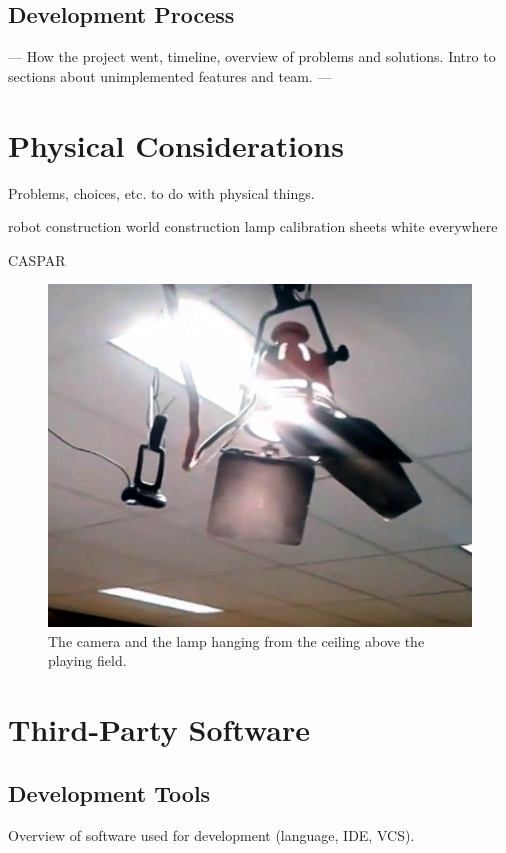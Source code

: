\documentclass[10pt, abstracton, twocolumn]{scrartcl}
\begin{document}
\subsection{Development Process}
---
How the project went, timeline, overview of problems and solutions. Intro to sections about unimplemented features and team.
---

\section{Physical Considerations}
Problems, choices, etc. to do with physical things.

robot construction
world construction
lamp
calibration sheets
white everywhere

CASPAR

\begin{figure}
        \centering
        \includegraphics[width=\columnwidth]{pictures/photo2.png}
        \caption{\small The camera and the lamp hanging from the ceiling above the playing field.}
        \label{fig:photo2}
\end{figure}

\section{Third-Party Software}

\subsection{Development Tools}
Overview of software used for development (language, IDE, VCS).
\end{document}
